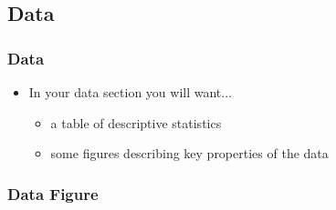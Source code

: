 \documentclass{beamer}
\begin{document}
\subsection{Data}

  \begin{frame}
  \frametitle{Data}
    \begin{itemize}
      \item In your data section you will want...
      \begin{itemize}
        \item a table of descriptive statistics
        \item some figures describing key properties of the data
      \end{itemize}
    \end{itemize}
  \end{frame}

  \begin{frame}
  \frametitle{Data Figure}
    \begin{figure}[htb]\centering
    \end{figure}
  \end{frame}
\end{document}
